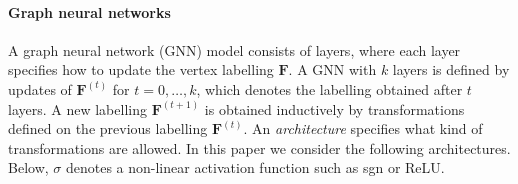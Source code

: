 \paragraph*{Graph neural networks}
A graph neural network (GNN) model consists of layers, where each layer specifies how to update the vertex labelling $\mathbf{F}$. A GNN with $k$ layers is defined by updates of $\mathbf{F}^{(t)}$ for $t = 0, \ldots,k$, which denotes the labelling obtained after $t$ layers. A new labelling $\mathbf{F}^{(t+1)}$ is obtained inductively by transformations defined on the previous labelling $\mathbf{F}^{(t)}$. An \emph{architecture} specifies what kind of transformations are allowed. In this paper we consider the following architectures. Below, $\sigma$ denotes a non-linear activation function such as sgn or ReLU. 

